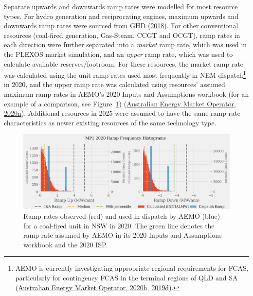 \documentclass[12pt,a4paper,]{report}
\begin{document}
Separate upwards and downwards ramp rates were modelled for most
resource types. For hydro generation and reciprocating engines, maximum
upwards and downwards ramp rates were sourced from GHD
(\protect\hyperlink{ref-ghd2018AEMOCost2018}{2018}). For other
conventional resources (coal-fired generation, Gas-Steam, CCGT and
OCGT), ramp rates in each direction were further separated into a
\emph{market} ramp rate, which was used in the PLEXOS market simulation,
and an \emph{upper} ramp rate, which was used to calculate available
reserves/footroom. For these resources, the market ramp rate was
calculated using the unit ramp rates used most frequently in NEM
dispatch\footnote{AEMO is currently investigating appropriate regional
  requirements for FCAS, particularly for contingency FCAS in the
  terminal regions of QLD and SA
  (\protect\hyperlink{ref-australianenergymarketoperatorRenewableIntegrationStudy2020b}{Australian
  Energy Market Operator, 2020h},
  \protect\hyperlink{ref-australianenergymarketoperatorElectricityRuleChange2019a}{2019d}).}
in 2020, and the upper ramp rate was calculated using resources' assumed
maximum ramp rates in AEMO's 2020 Inputs and Assumptions workbook (for
an example of a comparison, see Figure~\ref{fig:ramp_rate_comparison})
(\protect\hyperlink{ref-australianenergymarketoperator2020InputsAssumptions2020}{Australian
Energy Market Operator, 2020n}). Additional resources in 2025 were
assumed to have the same ramp rate characteristics as newer existing
resources of the same technology type.

\begin{figure}
\hypertarget{fig:ramp_rate_comparison}{%
\centering
\includegraphics{source/figures/coal_market_upper_ramps.png}
\caption[Observed, submitted and ISP ramp rates for a NSW coal-fired
unit]{Ramp rates observed (red) and used in dispatch by AEMO (blue) for
a coal-fired unit in NSW in 2020. The green line denotes the ramp rate
assumed by AEMO in its 2020 Inputs and Assumptions workbook and the 2020
ISP.}\label{fig:ramp_rate_comparison}
}
\end{figure}
\end{document}
